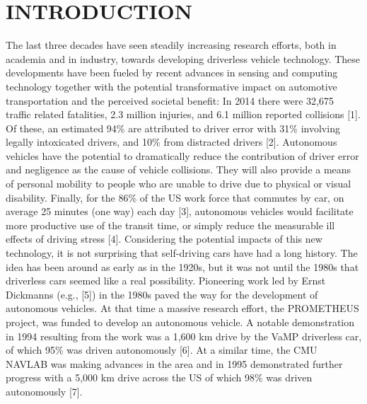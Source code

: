 \documentclass[a4paper,10pt]{article}
\begin{document}
\section{INTRODUCTION}
The last three decades have seen steadily increasing research efforts, both in academia and in industry, towards developing driverless vehicle technology. These developments have been fueled by recent advances in sensing and computing technology together with the potential transformative impact on automotive transportation and the perceived societal benefit: In 2014 there were 32,675 traffic related fatalities, 2.3 million injuries, and 6.1 million reported collisions [1]. Of these, an estimated 94\% are attributed to driver error with 31\% involving legally intoxicated drivers, and 10\% from distracted drivers [2]. Autonomous vehicles have the potential to dramatically reduce the contribution of driver error and negligence as the cause of vehicle collisions. They will also provide a means of personal mobility to people who are unable to drive due to physical or visual disability. Finally, for the 86\% of the US work force that commutes by car, on average 25 minutes (one way) each day [3], autonomous vehicles would facilitate more productive use of the transit time, or simply reduce the measurable ill effects of driving stress [4]. Considering the potential impacts of this new technology, it is not surprising that self-driving cars have had a long history. The idea has been around as early as in the 1920s, but it was not until the 1980s that driverless cars seemed like a real possibility. Pioneering work led by Ernst Dickmanns (e.g., [5]) in the 1980s paved the way for the development of autonomous vehicles. At that time a massive research effort, the PROMETHEUS project, was funded to develop an autonomous vehicle. A notable demonstration in 1994 resulting from the work was a 1,600 km drive by the VaMP driverless car, of which 95\% was driven autonomously [6]. At a similar time, the CMU NAVLAB was making advances in the area and in 1995 demonstrated further progress with a 5,000 km drive across the US of which 98\% was driven autonomously [7].
\end{document}
